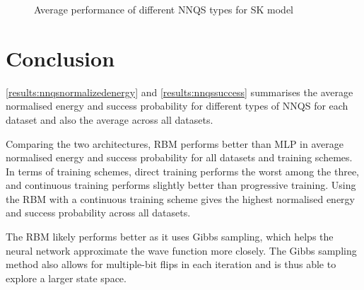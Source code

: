 \begin{figure}[!htb]
    \centering
    \caption{Average performance of different NNQS types for SK model}
    \label{nnqs-skmodel-average}
\end{figure}

\section{Conclusion}
\autoref{results:nnqsnormalizedenergy} and \autoref{results:nnqssuccess} summarises the average normalised energy and success probability for different types of NNQS for each dataset and also the average across all datasets.

Comparing the two architectures, RBM performs better than MLP in average normalised energy and success probability for all datasets and training schemes. In terms of training schemes, direct training performs the worst among the three, and continuous training performs slightly better than progressive training. Using the RBM with a continuous training scheme gives the highest normalised energy and success probability across all datasets. 

The RBM likely performs better as it uses Gibbs sampling, which helps the neural network approximate the wave function more closely. The Gibbs sampling method also allows for multiple-bit flips in each iteration and is thus able to explore a larger state space.

